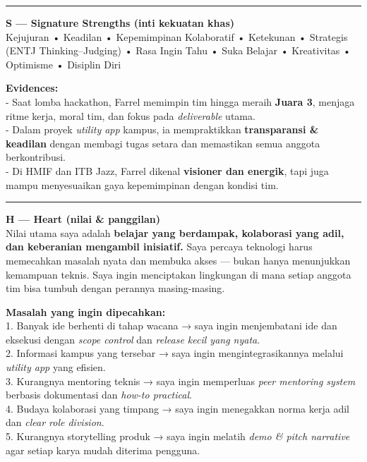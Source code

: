 \documentclass[
  letterpaper,
  DIV=11,
  numbers=noendperiod]{scrreprt}
\begin{document}
\begin{center}\rule{0.5\linewidth}{0.5pt}\end{center}

\textbf{S --- Signature Strengths (inti kekuatan khas)}\\
Kejujuran • Keadilan • Kepemimpinan Kolaboratif • Ketekunan • Strategis
(ENTJ Thinking--Judging) • Rasa Ingin Tahu • Suka Belajar • Kreativitas
• Optimisme • Disiplin Diri

\textbf{Evidences:}\\
- Saat lomba hackathon, Farrel memimpin tim hingga meraih \textbf{Juara
3}, menjaga ritme kerja, moral tim, dan fokus pada \emph{deliverable}
utama.\\
- Dalam proyek \emph{utility app} kampus, ia mempraktikkan
\textbf{transparansi \& keadilan} dengan membagi tugas setara dan
memastikan semua anggota berkontribusi.\\
- Di HMIF dan ITB Jazz, Farrel dikenal \textbf{visioner dan energik},
tapi juga mampu menyesuaikan gaya kepemimpinan dengan kondisi tim.

\begin{center}\rule{0.5\linewidth}{0.5pt}\end{center}

\textbf{H --- Heart (nilai \& panggilan)}\\
Nilai utama saya adalah \textbf{belajar yang berdampak, kolaborasi yang
adil, dan keberanian mengambil inisiatif.} Saya percaya teknologi harus
memecahkan masalah nyata dan membuka akses --- bukan hanya menunjukkan
kemampuan teknis. Saya ingin menciptakan lingkungan di mana setiap
anggota tim bisa tumbuh dengan perannya masing-masing.

\textbf{Masalah yang ingin dipecahkan:}\\
1. Banyak ide berhenti di tahap wacana → saya ingin menjembatani ide dan
eksekusi dengan \emph{scope control} dan \emph{release kecil yang
nyata}.\\
2. Informasi kampus yang tersebar → saya ingin mengintegrasikannya
melalui \emph{utility app} yang efisien.\\
3. Kurangnya mentoring teknis → saya ingin memperluas \emph{peer
mentoring system} berbasis dokumentasi dan \emph{how-to practical}.\\
4. Budaya kolaborasi yang timpang → saya ingin menegakkan norma kerja
adil dan \emph{clear role division}.\\
5. Kurangnya storytelling produk → saya ingin melatih \emph{demo \&
pitch narrative} agar setiap karya mudah diterima pengguna.
\end{document}
